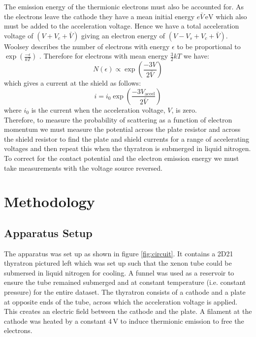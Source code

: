 \documentclass[%
reprint,
amsmath,amssymb,
aps,
floatfix
]{revtex4-2}
\begin{document}
	The emission energy of the thermionic electrons must also be accounted for. As the electrons leave the cathode they have a mean initial energy $e\bar{V} \,\text{eV}$ which also must be added to the acceleration voltage. Hence we have a total acceleration voltage of $(V + V_c + \bar{V})$ giving an electron energy of $(V - V_s + V_c + \bar{V})$. Woolsey describes the number of electrons with energy $\epsilon$ to be proportional to $\exp{\left( \frac{-\epsilon}{kT} \right)}$ \cite{woolsey}. Therefore for electrons with mean energy $\frac{3}{2}kT$ we have:
	\begin{equation}
		N(\epsilon) \propto \exp{\left( \frac{-3 V}{2 \bar{V}} \right)}
	\end{equation}which gives a current at the shield as follows:	
	\begin{equation}
		i = i_0 \exp{\left( \frac{-3 V_\text{accel}}{2 \bar{V}} \right)}
		\label{eq:slope}
	\end{equation}where $i_0$ is the current when the acceleration voltage, $V$, is zero.\\
	
	Therefore, to measure the probability of scattering as a function of electron momentum we must measure the potential across the plate resistor and across the shield resistor to find the plate and shield currents for a range of accelerating voltages and then repeat this when the thyratron is submerged in liquid nitrogen. To correct for the contact potential and the electron emission energy we must take measurements with the voltage source reversed.
	
	\section{Methodology}
	\subsection{Apparatus Setup}
	The apparatus was set up as shown in figure \ref{fig:circuit}. It contains a 2D21 thyratron pictured left which was set up such that the xenon tube could be submersed in liquid nitrogen for cooling. A funnel was used as a reservoir to ensure the tube remained submerged and at constant temperature (i.e. constant pressure) for the entire dataset. The thyratron consists of a cathode and a plate at opposite ends of the tube, across which the acceleration voltage is applied. This creates an electric field between the cathode and the plate. A filament at the cathode was heated by a constant $4 \,\text{V}$ to induce thermionic emission to free the electrons. \\
	
\end{document}
